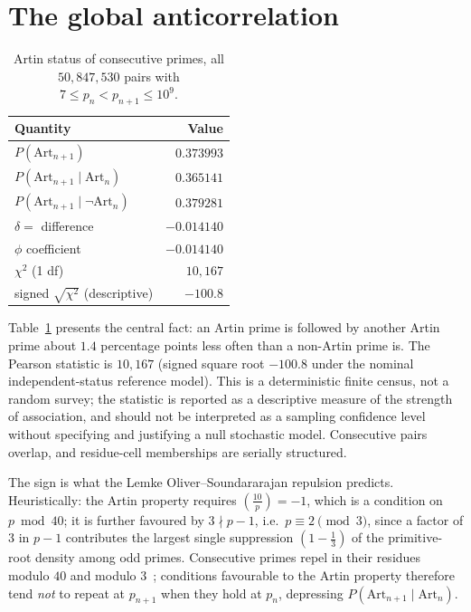 \documentclass[11pt,reqno]{amsart}
\theoremstyle{plain}
\theoremstyle{definition}
\newcommand{\Art}{\mathrm{Art}}
\newcommand{\Lsym}[2]{\left(\tfrac{#1}{#2}\right)}
\begin{document}
\section{The global anticorrelation}
\label{sec:global}

\begin{table}[ht]
	\centering
	\caption{Artin status of consecutive primes, all $50{,}847{,}530$ pairs with
	$7 \le p_n < p_{n+1} \le 10^9$.}
	\label{tab:global}
	\begin{tabular}{lr}
		\toprule
		Quantity                         & Value       \\
		\midrule
		$P(\Art_{n+1})$                  & $0.373993$  \\
		$P(\Art_{n+1} \mid \Art_n)$      & $0.365141$  \\
		$P(\Art_{n+1} \mid \lnot\Art_n)$ & $0.379281$  \\
		$\delta = $ difference           & $-0.014140$ \\
		$\phi$ coefficient               & $-0.014140$ \\
		$\chi^2$ (1 df)                  & $10{,}167$  \\
		signed $\sqrt{\chi^2}$ (descriptive)              & $-100.8$    \\
		\bottomrule
	\end{tabular}
\end{table}

Table~\ref{tab:global} presents the central fact: an Artin prime is followed by
another Artin prime about $1.4$ percentage points less often than a non-Artin
prime is. The Pearson statistic is $10{,}167$ (signed square root $-100.8$ under
the nominal independent-status reference model). This is a deterministic finite
census, not a random survey; the statistic is reported as a descriptive measure
of the strength of association, and should not be interpreted as a sampling
confidence level without specifying and justifying a null stochastic model.
Consecutive pairs overlap, and residue-cell memberships are serially structured.

The sign is what the Lemke Oliver--Soundararajan repulsion predicts.
Heuristically: the Artin property requires $\Lsym{10}{p} = -1$, which is a
condition on $p \bmod 40$; it is further favoured by $3 \nmid p - 1$, i.e.\
$p \equiv 2 \pmod 3$, since a factor of $3$ in $p-1$ contributes the largest
single suppression $(1 - \tfrac13)$ of the primitive-root density among odd
primes. Consecutive primes repel in their residues modulo $40$ and modulo
$3$~\cite{LOS2016}; conditions favourable to the Artin property therefore tend
\emph{not} to repeat at $p_{n+1}$ when they hold at $p_n$, depressing
$P(\Art_{n+1} \mid \Art_n)$.
\end{document}
